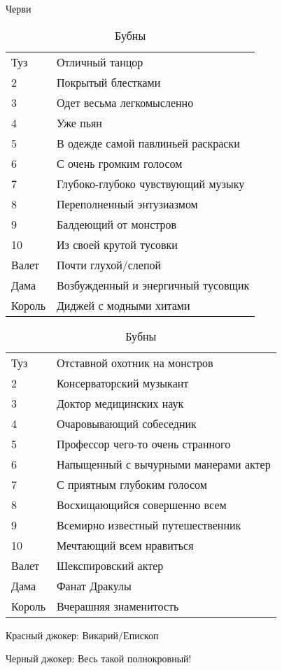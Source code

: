 \documentclass[twoside,twocolumn]{article}
\begin{document}
\begin{table}[!htb]
\begin{minipage}{.5\linewidth}
      \caption*{Черви}
      \centering
        \begin{tabular}{ll}
Туз & Отличный танцор\\
2 & Покрытый блестками\\
3 & Одет весьма легкомысленно\\
4 & Уже пьян\\
5 & В одежде самой павлиньей раскраски\\
6 & С очень громким голосом\\
7 & Глубоко-глубоко чувствующий музыку\\
8 & Переполненный энтузиазмом\\
9 & Балдеющий от монстров\\
10 & Из своей крутой тусовки\\
Валет & Почти глухой/слепой\\
Дама & Возбужденный и энергичный тусовщик\\
Король & Диджей с модными хитами
        \end{tabular}
    \end{minipage}%
\begin{minipage}{2.7\linewidth}
      \caption*{Бубны}
      \centering
        \begin{tabular}{ll}
Туз & Отставной охотник на монстров\\
2 & Консерваторский музыкант\\
3 & Доктор медицинских наук\\
4 & Очаровывающий собеседник\\
5 & Профессор чего-то очень странного\\
6 & Напыщенный с вычурными манерами актер\\
7 & С приятным глубоким голосом\\
8 & Восхищающийся совершенно всем\\
9 & Всемирно известный путешественник\\
10 & Мечтающий всем нравиться\\
Валет & Шекспировский актер\\
Дама & Фанат Дракулы\\
Король & Вчерашняя знаменитость
        \end{tabular}
    \end{minipage}%
\end{table}

\noindent Красный джокер: Викарий/Епископ

\noindent Черный джокер: Весь такой полнокровный!
\end{document}
